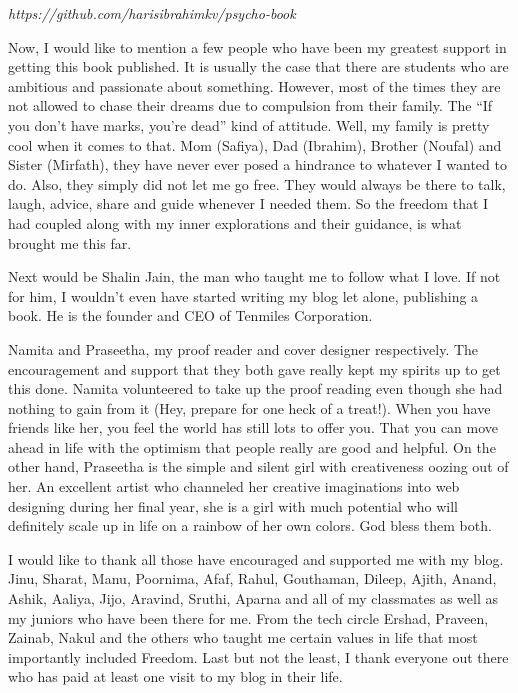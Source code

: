 \documentclass[twoside,11pt,titlepage]{article}
\begin{document}
\emph{https://github.com/harisibrahimkv/psycho-book}

Now, I would like to mention a few people who have been my greatest support in getting this book published. It is usually the case that there are students who are ambitious and passionate about something. However, most of the times they are not allowed to chase their dreams due to compulsion from their family. The ``If you don't have marks, you're dead'' kind of attitude. Well, my family is pretty cool when it comes to that. Mom (Safiya), Dad (Ibrahim), Brother (Noufal) and Sister (Mirfath), they have never ever posed a hindrance to whatever I wanted to do. Also, they simply did not let me go free. They would always be there to talk, laugh, advice, share and guide whenever I needed them. So the freedom that I had coupled along with my inner explorations and their guidance, is what brought me this far.

Next would be Shalin Jain, the man who taught me to follow what I love. If not for him, I wouldn't even have started writing my blog let alone, publishing a book. He is the founder and CEO of Tenmiles Corporation.

Namita and Praseetha, my proof reader and cover designer respectively. The encouragement and support that they both gave really kept my spirits up to get this done. Namita volunteered to take up the proof reading even though she had nothing to gain from it (Hey, prepare for one heck of a treat!). When you have friends like her, you feel the world has still lots to offer you. That you can move ahead in life with the optimism that people really are good and helpful. On the other hand, Praseetha is the simple and silent girl with creativeness oozing out of her. An excellent artist who channeled her creative imaginations into web designing during her final year, she is a girl with much potential who will definitely scale up in life on a rainbow of her own colors. God bless them both.

I would like to thank all those have encouraged and supported me with my blog. Jinu, Sharat, Manu, Poornima, Afaf, Rahul, Gouthaman, Dileep, Ajith, Anand, Ashik, Aaliya, Jijo, Aravind, Sruthi, Aparna and all of my classmates as well as my juniors who have been there for me. From the tech circle Ershad, Praveen, Zainab, Nakul and the others who taught me certain values in life that most importantly included Freedom. Last but not the least, I thank everyone out there who has paid at least one visit to my blog in their life.
\end{document}

